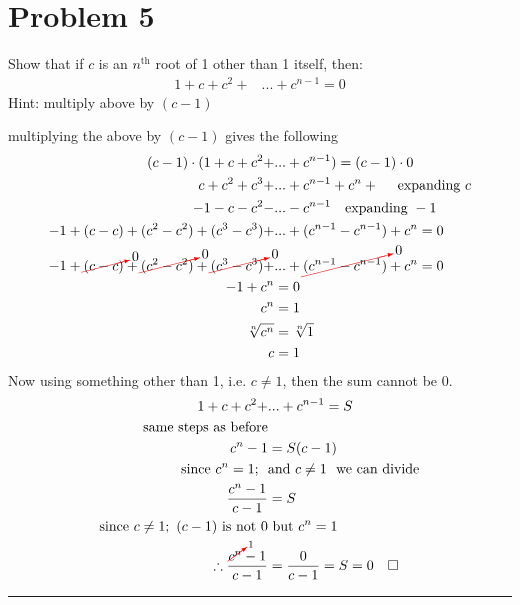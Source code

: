 \documentclass{article}
\newcommand{\canceling}[2]{\textcolor{red}{\cancelto{\textcolor{black}{#1}}{\textcolor{black}{#2}}}}
\begin{document}
\section*{Problem 5}
Show that if $c$ is an $n^{\text{th}}$ root of 1 other than 1 itself, then:
\begin{align*}
  1 + c + c^2 + &... + c^{n-1} = 0
\end{align*}
Hint: multiply above by $(c-1)$

multiplying the above by $(c-1)$ gives the following
\begin{align*}
  (c-1)\cdot(1 + c + c^2 + &... + c^{n-1}) = (c-1)\cdot 0\\
  c + c^2 + c^3 + &... + c^{n-1} + c^n +\ \ \ \text{ expanding }c \\
  -1 -c -c^2 -&... -c^{n-1} \ \ \ \text{expanding }-1\\
  -1 + (c-c) + (c^2-c^2) + (c^3-c^3) +&... + (c^{n-1}-c^{n-1}) + c^n = 0\\
  -1 + \canceling{0}{(c-c)} + \canceling{0}{(c^2-c^2)} + \canceling{0}{(c^3-c^3)} +&... + \canceling{0}{(c^{n-1}-c^{n-1})} + c^n = 0\\
  -1 + c^n &= 0\\
  c^n &= 1\\
  \sqrt[n]{c^n} &= \sqrt[n]{1}\\
  c &= 1
\end{align*}
Now using something other than 1, i.e. $c\neq 1$, then the sum cannot be 0.
\begin{align*}
  1 + c + c^2 + &... + c^{n-1} = S\\
  \text{same steps as before}&\\
  c^n -1 &= S(c-1)\\
  \text{since }c^n = 1;\ \ &\text{and }c \neq 1\ \ \text{we can divide}\\
  \frac{c^n -1}{c-1} &= S\\
  \text{since }c \neq 1;\ (c-1)\ \text{is not}\ 0 & \text{ but }c^n = 1\\
  \therefore \frac{\canceling{1}{c^n}-1}{c-1} &= \frac{0}{c-1} = S = 0 \quad \square
\end{align*}

 \vspace{1cm}
 \hrule
\newpage
\end{document}
